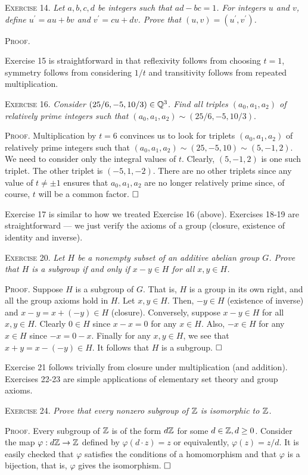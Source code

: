 \documentclass[11pt, leqno]{article}
\newcommand{\done}{\ensuremath{\hfill\square}}
\begin{document}
\textsc{Exercise 14}. \emph{Let $a,b,c,d$ be integers such that $ad-bc=1$. For integers $u$ and $v$, define $u^{\prime}=au+bv$ and $v^{\prime}=cu+dv$. Prove that $(u,v)=(u^{\prime},v^{\prime})$.}

\textsc{Proof}.

Exercise 15 is straightforward in that reflexivity follows from choosing $t=1$, symmetry follows from considering $1/t$ and transitivity follows from repeated multiplication.

\textsc{Exercise 16}. \emph{Consider $(25/6, -5, 10/3) \in \mathbb{Q}^3$. Find all triples $(a_0,a_1,a_2)$ of relatively prime integers such that $(a_0,a_1,a_2)\sim (25/6, -5, 10/3)$}.

\textsc{Proof}. Multiplication by $t=6$ convinces us to look for triplets $(a_0,a_1,a_2)$ of relatively prime integers such that $(a_0,a_1,a_2)\sim (25, -5, 10)\sim (5, -1, 2)$. We need to consider only the integral values of $t$. Clearly, $(5, -1, 2)$ is one such triplet. The other triplet is $(-5, 1, -2)$. There are no other triplets since any value of $t\ne \pm 1$ ensures that $a_0,a_1,a_2$ are no longer relatively prime since, of course, $t$ will be a common factor. \done

Exercise 17 is similar to how we treated Exercise 16 (above). Exercises 18-19 are straightforward --- we just verify the axioms of a group (closure, existence of identity and inverse).

\textsc{Exercise 20}. \emph{Let $H$ be a nonempty subset of an additive abelian group $G$. Prove that $H$ is a subgroup if and only if $x-y \in H$ for all $x,y\in H$.}

\textsc{Proof}. Suppose $H$ is a subgroup of $G$. That is, $H$ is a group in its own right, and all the group axioms hold in $H$. Let $x,y\in H$. Then, $-y \in H$ (existence of inverse) and $x-y = x+(-y) \in H$ (closure). Conversely, suppose $x-y \in H$ for all $x,y\in H$. Clearly $0 \in H$ since $x-x=0$ for any $x\in H$. Also, $-x \in H$ for any $x\in H$ since $-x = 0-x$. Finally for any $x,y\in H$, we see that $x+y = x-(-y) \in H$. It follows that $H$ is a subgroup. \done

Exercise 21 follows trivially from closure under multiplication (and addition). Exercises 22-23 are simple applications of elementary set theory and group axioms.

\textsc{Exercise 24}. \emph{Prove that every nonzero subgroup of $\mathbb{Z}$ is isomorphic to $\mathbb{Z}$.}

\textsc{Proof}. Every subgroup of $\mathbb{Z}$ is of the form $d\mathbb{Z}$ for some $d\in\mathbb{Z}, d\geq 0$. Consider the map $\varphi: d\mathbb{Z} \to \mathbb{Z}$ defined by $\varphi (d\cdot z) = z$ or equivalently, $\varphi(z) = z/d$. It is easily checked that $\varphi$ satisfies the conditions of a homomorphism and that $\varphi$ is a bijection, that is, $\varphi$ gives the isomorphism. \done
\end{document}
